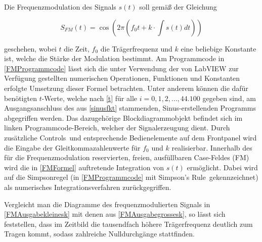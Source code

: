 \documentclass[
a4paper,
12pt,
pagesize,
ngerman
]{scrartcl}
\begin{document}
	Die Frequenzmodulation des Signals $s(t)$ soll gemäß der Gleichung
	
	\begin{equation} \label{FMFormel}
	S_{FM}(t) = \cos (2\pi (f_0 t + k \cdot \int s(t) dt))
	\end{equation}
	
	\noindent geschehen, wobei $t$ die Zeit, $f_0$ die Trägerfrequenz und $k$ eine beliebige Konstante ist, welche die Stärke der Modulation bestimmt. 
	Am Programmcode in \cref{FMProgrammcode} lässt sich die unter Verwendung der von LabVIEW zur Verfügung gestellten numerischen Operationen, Funktionen und Konstanten erfolgte Umsetzung dieser Formel betrachten. 
	Unter anderem können die dafür benötigten $t$-Werte, welche nach \cref{t} für alle $i = 0,1,2,...,44.100$ gegeben sind, am Ausgangsanschluss des aus \cref{sinusfkt} stammenden, Sinus-erstellenden Programms abgegriffen werden. 
	Das dazugehörige Blockdiagrammobjekt befindet sich im linken Programmcode-Bereich, welcher der Signalerzeugung dient. 
	Durch zusätzliche \glqq Controls\grqq\ und entsprechende Bedienelemente auf dem Frontpanel wird die Eingabe der Gleitkommazahlenwerte für $f_0$ und $k$ realisierbar. 
	Innerhalb des für die Frequenzmodulation reservierten, freien, ausfüllbaren Case-Feldes (\glqq FM\grqq ) wird die in \cref{FMFormel} auftretende Integration von $s(t)$ ermöglicht.
	Dabei wird auf die Simpsonregel (in \cref{FMProgrammcode} mit \glqq Simpson's Rule\grqq\ gekennzeichnet) als numerisches Integrationsverfahren zurückgegriffen.
	
	Vergleicht man die Diagramme des frequenzmodulierten Signals in \cref{FMAusgabekleinesk} mit denen aus \cref{FMAusgabegrossesk}, so lässt sich feststellen, dass im Zeitbild die tausendfach höhere Trägerfrequenz deutlich zum Tragen kommt, sodass zahlreiche Nulldurchgänge stattfinden. 
	
\end{document}
